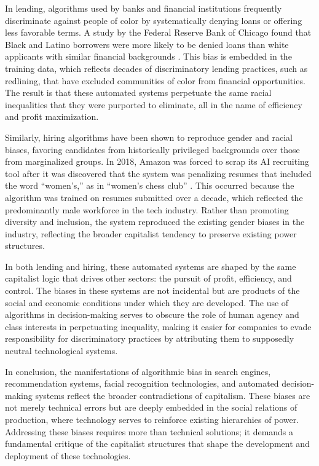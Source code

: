 \begin{refsection}
In lending, algorithms used by banks and financial institutions frequently discriminate against people of color by systematically denying loans or offering less favorable terms. A study by the Federal Reserve Bank of Chicago found that Black and Latino borrowers were more likely to be denied loans than white applicants with similar financial backgrounds \cite[pp.~55-58]{bartlett2021}. This bias is embedded in the training data, which reflects decades of discriminatory lending practices, such as redlining, that have excluded communities of color from financial opportunities. The result is that these automated systems perpetuate the same racial inequalities that they were purported to eliminate, all in the name of efficiency and profit maximization.

Similarly, hiring algorithms have been shown to reproduce gender and racial biases, favoring candidates from historically privileged backgrounds over those from marginalized groups. In 2018, Amazon was forced to scrap its AI recruiting tool after it was discovered that the system was penalizing resumes that included the word “women’s,” as in “women’s chess club” \cite[pp.~41-43]{krivoruchko2021}. This occurred because the algorithm was trained on resumes submitted over a decade, which reflected the predominantly male workforce in the tech industry. Rather than promoting diversity and inclusion, the system reproduced the existing gender biases in the industry, reflecting the broader capitalist tendency to preserve existing power structures.

In both lending and hiring, these automated systems are shaped by the same capitalist logic that drives other sectors: the pursuit of profit, efficiency, and control. The biases in these systems are not incidental but are products of the social and economic conditions under which they are developed. The use of algorithms in decision-making serves to obscure the role of human agency and class interests in perpetuating inequality, making it easier for companies to evade responsibility for discriminatory practices by attributing them to supposedly neutral technological systems.

In conclusion, the manifestations of algorithmic bias in search engines, recommendation systems, facial recognition technologies, and automated decision-making systems reflect the broader contradictions of capitalism. These biases are not merely technical errors but are deeply embedded in the social relations of production, where technology serves to reinforce existing hierarchies of power. Addressing these biases requires more than technical solutions; it demands a fundamental critique of the capitalist structures that shape the development and deployment of these technologies.


\end{refsection}
